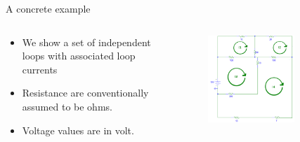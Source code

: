 \documentclass[xcolor=dvipsnames]{beamer}
\begin{document}
\begin{frame}{A concrete example}

   \begin{columns}
        \begin{column}{.45\textwidth}
        \begin{itemize}
        	\item We show a set of independent loops with associated loop currents
        	\item Resistance are conventionally assumed to be ohms.
        	\item Voltage values are in volt.
        \end{itemize}

        \end{column}
		\begin{column}{.65\textwidth}
 	     \begin{figure}[!ht]
  			\centering
    		\includegraphics[width=0.7\textwidth]{concreteEg.png}
    		\label{fig:eg5}
    	 \end{figure}
      	\end{column}
    \end{columns}
\end{frame}
\end{document}
